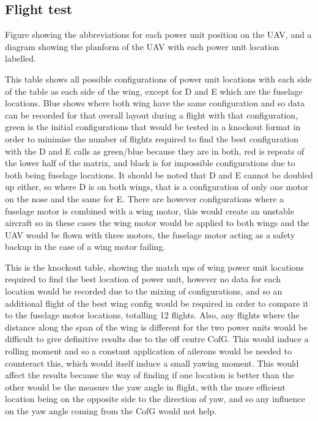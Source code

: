 \documentclass[../../main.tex]{subfiles}
\begin{document}

\subsection{Flight test} \label{sec:project-review:testing-and-evaluation:flight-test}

Figure showing the abbreviations for each power unit position on the UAV, and a diagram showing the planform of the UAV with each power unit location labelled. 


This table shows all possible configurations of power unit locations with each side of the table as each side of the wing, except for D and E which are the fuselage locations.
Blue shows where both wing have the same configuration and so data can be recorded for that overall layout during a flight with that configuration, green is the initial configurations that would be tested in a knockout format in order to minimise the number of flights required to find the best configuration with the D and E calls as green/blue because they are in both, red is repeats of the lower half of the matrix, and black is for impossible configurations due to both being fuselage locations.
It should be noted that D and E cannot be doubled up either, so where D is on both wings, that is a configuration of only one motor on the nose and the same for E.
There are however configurations where a fuselage motor is combined with a wing motor, this would create an unstable aircraft so in these cases the wing motor would be applied to both wings and the UAV would be flown with three motors, the fuselage motor acting as a safety backup in the case of a wing motor failing.


This is the knockout table, showing the match ups of wing power unit locations required to find the best location of power unit, however no data for each location would be recorded due to the mixing of configurations, and so an additional flight of the best wing config would be required in order to compare it to the fuselage motor locations, totalling 12 flights.
Also, any flights where the distance along the span of the wing is different for the two power units would be difficult to give definitive results due to the off centre CofG.
This would induce a rolling moment and so a constant application of ailerons would be needed to counteract this, which would itself induce a small yawing moment.
This would affect the results because the way of finding if one location is better than the other would be the measure the yaw angle in flight, with the more efficient location being on the opposite side to the direction of yaw, and so any influence on the yaw angle coming from the CofG would not help. 
\end{document}
